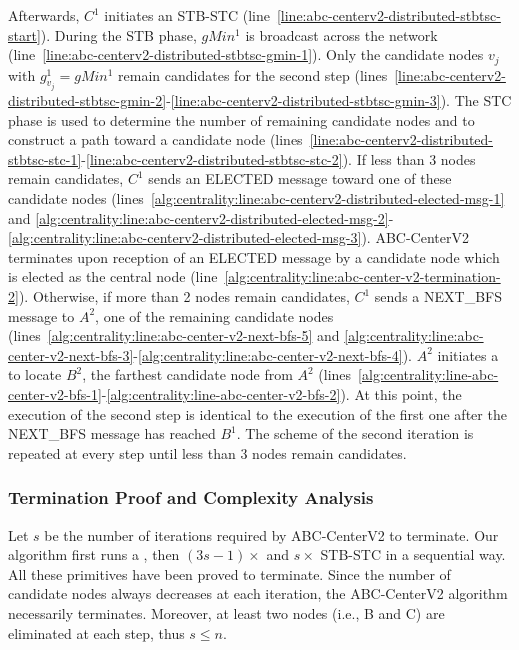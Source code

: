 Afterwards, $C^1$ initiates an STB-STC (line~\ref{line:abc-centerv2-distributed-stbtsc-start}). During the STB phase, $gMin^1$ is broadcast across the network (line~\ref{line:abc-centerv2-distributed-stbtsc-gmin-1}). Only the candidate nodes $v_j$ with $g^1_{v_j} =  gMin^1$ remain candidates for the second step (lines~\ref{line:abc-centerv2-distributed-stbtsc-gmin-2}-\ref{line:abc-centerv2-distributed-stbtsc-gmin-3}). The STC phase is used to determine the number of remaining candidate nodes and to construct a path toward a candidate node (lines~\ref{line:abc-centerv2-distributed-stbtsc-stc-1}-\ref{line:abc-centerv2-distributed-stbtsc-stc-2}). If less than 3 nodes remain candidates, $C^1$ sends an ELECTED message toward one of these candidate nodes (lines~\ref{alg:centrality:line:abc-centerv2-distributed-elected-msg-1} and \ref{alg:centrality:line:abc-centerv2-distributed-elected-msg-2}-\ref{alg:centrality:line:abc-centerv2-distributed-elected-msg-3}). ABC-CenterV2 terminates upon reception of an ELECTED message by a candidate node which is elected as the central node (line~\ref{alg:centrality:line:abc-center-v2-termination-2}). Otherwise, if more than 2 nodes remain candidates, $C^1$ sends a NEXT\_BFS message to $A^2$, one of the remaining candidate nodes (lines~\ref{alg:centrality:line:abc-center-v2-next-bfs-5} and \ref{alg:centrality:line:abc-center-v2-next-bfs-3}-\ref{alg:centrality:line:abc-center-v2-next-bfs-4}). $A^2$ initiates a \cheungCbAgg{} to locate $B^2$, the farthest candidate node from $A^2$ (lines~\ref{alg:centrality:line-abc-center-v2-bfs-1}-\ref{alg:centrality:line-abc-center-v2-bfs-2}). At this point, the execution of the second step is identical to the execution of the first one after the NEXT\_BFS message has reached $B^1$. The scheme of the second iteration is repeated at every step until less than 3 nodes remain candidates.

\subsubsection{Termination Proof and Complexity Analysis}

Let $s$ be the number of iterations required by ABC-CenterV2 to terminate. Our algorithm first runs a \cheungIeCbAgg{},  then $(3s - 1) \times $ \cheungCbAgg{} and $s \times $ STB-STC in a sequential way. All these primitives have been proved to terminate. Since the number of candidate nodes always decreases at each iteration, the ABC-CenterV2 algorithm necessarily terminates. Moreover, at least two nodes (i.e., B and C) are eliminated at each step, thus $s \leq n$.

